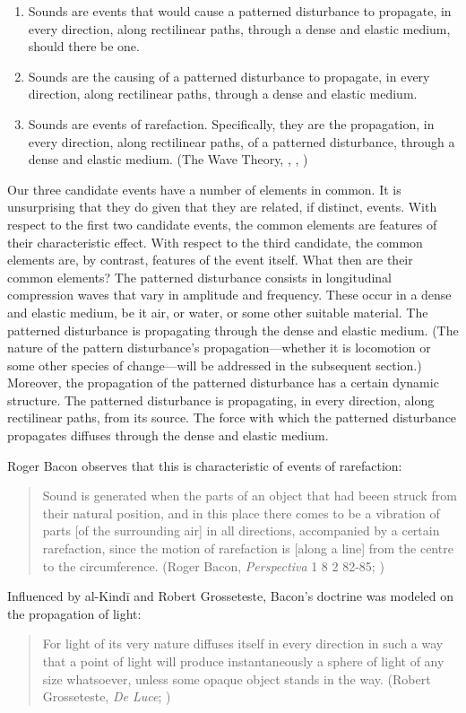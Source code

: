 \documentclass[12pt]{article}
\begin{document}
\begin{enumerate}
	\item Sounds are events that would cause a patterned disturbance to propagate, in every direction, along rectilinear paths, through a dense and elastic medium, should there be one. \citep{Casati:1994aa}
	\item Sounds are the causing of a patterned disturbance to propagate, in every direction, along rectilinear paths, through a dense and elastic medium. \citep{OCallaghan:2007xy}
	\item Sounds are events of rarefaction. Specifically, they are the propagation, in every direction, along rectilinear paths, of a patterned disturbance, through a dense and elastic medium. (The Wave Theory, \citealt{OShaughnessy:2009aa}, \citealt{Sorensen:2009aa}, \citealt[chapters 3–4]{Kalderon:2018oe})
\end{enumerate}
Our three candidate events have a number of elements in common. It is unsurprising that they do given that they are related, if distinct, events. With respect to the first two candidate events, the common elements are features of their characteristic effect. With respect to the third candidate, the common elements are, by contrast, features of the event itself. What then are their common elements? The patterned disturbance consists in longitudinal compression waves that vary in amplitude and frequency. These occur in a dense and elastic medium, be it air, or water, or some other suitable material. The patterned disturbance is propagating through the dense and elastic medium. (The nature of the pattern disturbance's propagation---whether it is locomotion or some other species of change---will be addressed in the subsequent section.) Moreover, the propagation of the patterned disturbance has a certain dynamic structure. The patterned disturbance is propagating, in every direction, along rectilinear paths, from its source. The force with which the patterned disturbance propagates diffuses through the dense and elastic medium. 

Roger Bacon observes that this is characteristic of events of rarefaction:
\begin{quote}
	Sound is generated when the parts of an object that had beeen struck from their natural position, and in this place there comes to be a vibration of parts [of the surrounding air] in all directions, accompanied by a certain rarefaction, since the motion of rarefaction is [along a line] from the centre to the circumference. (Roger Bacon, \emph{Perspectiva} 1 8 2 82-85; \citealt{Lindberg:1996bk})
\end{quote}
Influenced by al-Kindī and Robert Grosseteste, Bacon’s doctrine was modeled on the propagation of light:
\begin{quote}
	For light of its very nature diffuses itself in every direction in such a way that a point of light will produce instantaneously a sphere of light of any size whatsoever, unless some opaque object stands in the way. (Robert Grosseteste, \emph{De Luce}; \citealt[10]{Riedl:1942it})
\end{quote}
\end{document}
